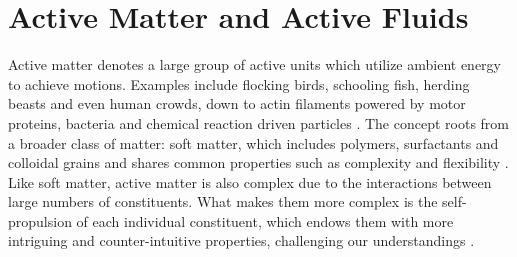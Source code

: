 \section{Active Matter and Active Fluids}
\label{active-fluids}

Active matter denotes a large group of active units which utilize ambient energy to achieve motions. Examples include flocking birds, schooling fish, herding beasts and even human crowds, down to actin filaments powered by motor proteins, bacteria and chemical reaction driven particles
\cite{Toner2005, Ramaswamy2010, Vicsek2012, Marchetti2013, Saintillan2013, Bechinger2016, Julicher2007}. The concept roots from a broader class of matter: soft matter, which includes polymers, surfactants and colloidal grains and shares common properties such as complexity and flexibility
\cite{DeGennes1992}. Like soft matter, active matter is also complex due to the interactions between large numbers of constituents. What makes them more complex is the self-propulsion of each individual constituent, which endows them with more intriguing and counter-intuitive properties, challenging our understandings \cite{Glotzer2015}.

